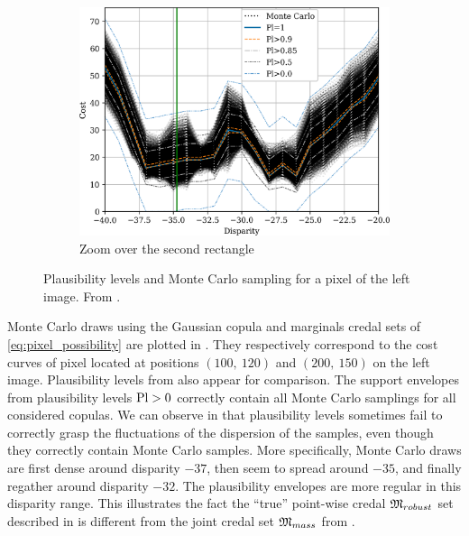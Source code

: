 \begin{figure}
\begin{subfigure}[t]{0.45\linewidth}
        \includegraphics[width=\linewidth]{Images/Chap_4/cost_curve_200_150_zoom2.png}
        \caption{Zoom over the second rectangle}
        \label{fig:montecarlo_gauss_200_150_zoom2}
    \end{subfigure}
    \caption{Plausibility levels and Monte Carlo sampling for a pixel of the left image.  From \cite{malinowski_uncertainty_2024}.}
    \label{fig:montecarlo_gauss_200_150}
\end{figure}

Monte Carlo draws using the Gaussian copula and marginals credal sets of \cref{eq:pixel_possibility} are plotted in . They respectively correspond to the cost curves of pixel located at positions $(100,~120)$ and $(200,~150)$ on the left image. Plausibility levels from  also appear for comparison. The support envelopes from plausibility levels $\mathrm{Pl}>0$ correctly contain all Monte Carlo samplings for all considered copulas. We can observe in  that plausibility levels sometimes fail to correctly grasp the fluctuations of the dispersion of the samples, even though they correctly contain Monte Carlo samples. More specifically, Monte Carlo draws are first dense around disparity $-37$, then seem to spread around $-35$, and finally regather around disparity $-32$. The plausibility envelopes are more regular in this disparity range. This illustrates the fact the ``true'' point-wise credal $\mathfrak{M}_{robust}$ set described in  is different from the joint credal set $\mathfrak{M}_{mass}$ from . 

